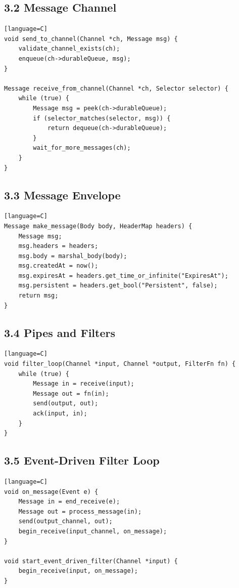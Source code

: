 \documentclass[11pt]{article}
\begin{document}
\subsection{3.2 Message Channel}\label{message-channel}

\begin{verbatim}[language=C]
void send_to_channel(Channel *ch, Message msg) {
    validate_channel_exists(ch);
    enqueue(ch->durableQueue, msg);
}

Message receive_from_channel(Channel *ch, Selector selector) {
    while (true) {
        Message msg = peek(ch->durableQueue);
        if (selector_matches(selector, msg)) {
            return dequeue(ch->durableQueue);
        }
        wait_for_more_messages(ch);
    }
}
\end{verbatim}

\subsection{3.3 Message Envelope}\label{message-envelope}

\begin{verbatim}[language=C]
Message make_message(Body body, HeaderMap headers) {
    Message msg;
    msg.headers = headers;
    msg.body = marshal_body(body);
    msg.createdAt = now();
    msg.expiresAt = headers.get_time_or_infinite("ExpiresAt");
    msg.persistent = headers.get_bool("Persistent", false);
    return msg;
}
\end{verbatim}

\subsection{3.4 Pipes and Filters}\label{pipes-and-filters}

\begin{verbatim}[language=C]
void filter_loop(Channel *input, Channel *output, FilterFn fn) {
    while (true) {
        Message in = receive(input);
        Message out = fn(in);
        send(output, out);
        ack(input, in);
    }
}
\end{verbatim}

\subsection{3.5 Event-Driven Filter
Loop}\label{event-driven-filter-loop}

\begin{verbatim}[language=C]
void on_message(Event e) {
    Message in = end_receive(e);
    Message out = process_message(in);
    send(output_channel, out);
    begin_receive(input_channel, on_message);
}

void start_event_driven_filter(Channel *input) {
    begin_receive(input, on_message);
}
\end{verbatim}
\end{document}

